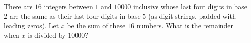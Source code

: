 There are $16$ integers between $1$ and $10000$ inclusive whose last four digits in base $2$ are the same as their last four digits in base $5$ (as digit strings, padded with leading zeros). Let $x$ be the sum of these $16$ numbers. What is the remainder when $x$ is divided by $10000$?
